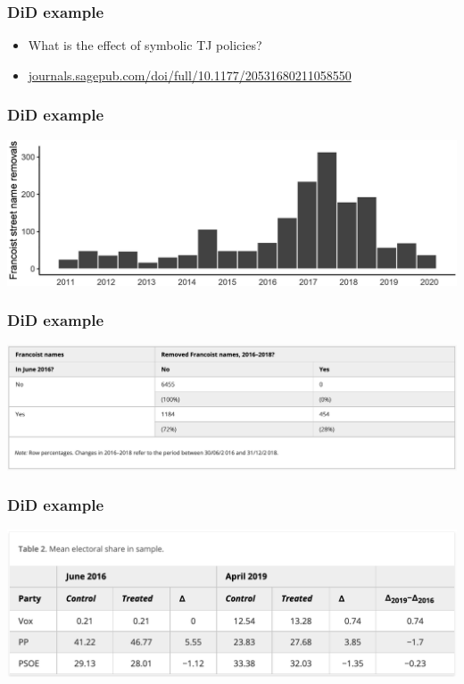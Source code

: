 \documentclass[aspectratio=43]{beamer}
\begin{document}
\begin{frame}
\frametitle{DiD example}
\centering

\begin{itemize}
  \item What is the effect of symbolic TJ policies?
  \item \href{https://journals.sagepub.com/doi/full/10.1177/20531680211058550}{journals.sagepub.com/doi/full/10.1177/20531680211058550}
\end{itemize}

\end{frame}

\begin{frame}
\frametitle{DiD example}
\centering

\includegraphics[width = \textwidth]{../img/did_TJ_hist}

\end{frame}

\begin{frame}
\frametitle{DiD example}
\centering

\includegraphics[width = \textwidth]{../img/did_TJ_groups}

\end{frame}


\begin{frame}
\frametitle{DiD example}
\centering

\includegraphics[width = \textwidth]{../img/did_TJ_base}

\end{frame}
\end{document}
